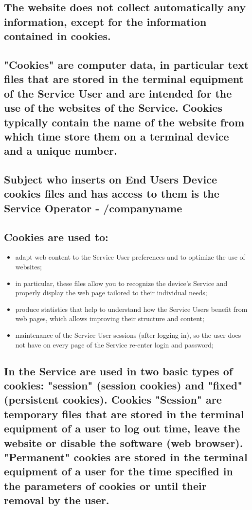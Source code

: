 \subsection{The website does not collect automatically any information, except for the information contained in cookies.}

\subsection{"Cookies" are computer data, in particular text files that are stored in the terminal equipment of the Service User and are intended for the use of the websites of the Service. Cookies typically contain the name of the website from which time store them on a terminal device and a unique number.}

\subsection{Subject who inserts on End Users Device cookies files and has access to them is the Service Operator - /companyname}

\subsection{Cookies are used to:}
\begin{itemize}
\item adapt web content to the Service User preferences and to optimize the use of websites; 
\item in particular, these files allow you to recognize the device's Service and properly display the web page tailored to their individual needs;
\item produce statistics that help to understand how the Service Users benefit from web pages, which allows improving their structure and content;
\item maintenance of the Service User sessions (after logging in), so the user does not have on every page of the Service re-enter login and password;
\end{itemize}

\subsection{In the Service are used in two basic types of cookies: "session" (session cookies) and "fixed" (persistent cookies). Cookies "Session" are temporary files that are stored in the terminal equipment of a user to log out time, leave the website or disable the software (web browser). "Permanent" cookies are stored in the terminal equipment of a user for the time specified in the parameters of cookies or until their removal by the user.}

